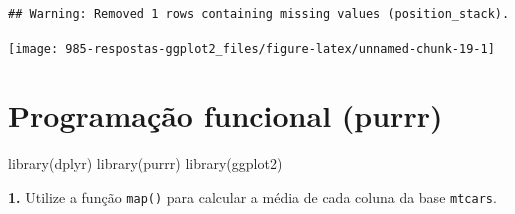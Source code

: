 \documentclass[
]{book}
\newenvironment{Shaded}{\begin{snugshade}}{\end{snugshade}}
\newcommand{\DocumentationTok}[1]{\textcolor[rgb]{0.56,0.35,0.01}{\textbf{\textit{#1}}}}
\newcommand{\FunctionTok}[1]{\textcolor[rgb]{0.00,0.00,0.00}{#1}}
\newcommand{\NormalTok}[1]{#1}
\begin{document}
\begin{verbatim}
## Warning: Removed 1 rows containing missing values (position_stack).
\end{verbatim}

\begin{center}\texttt{[image: 985-respostas-ggplot2\_files/figure-latex/unnamed-chunk-19-1]} \end{center}

\hypertarget{programauxe7uxe3o-funcional-purrr}{%
\section{Programação funcional (purrr)}\label{programauxe7uxe3o-funcional-purrr}}

\begin{Shaded}
\begin{Highlighting}[]
\FunctionTok{library}\NormalTok{(dplyr)}
\FunctionTok{library}\NormalTok{(purrr)}
\FunctionTok{library}\NormalTok{(ggplot2)}
\end{Highlighting}
\end{Shaded}

\textbf{1.} Utilize a função \texttt{map()} para calcular a média de cada coluna da base \texttt{mtcars}.

\begin{Shaded}
\end{Shaded}
\end{document}
